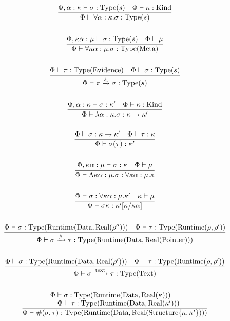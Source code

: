 \documentclass {article}
\begin{document}
\begin{gather*}
\frac
{\Phi, \alpha : \kappa \vdash \sigma : \text{Type}(s) \quad \Phi \vdash \kappa : \text{Kind}}
{\Phi \vdash \forall \alpha : \kappa. \sigma : \text{Type} (s) } \\
\\
\frac
{\Phi, \kappa \alpha : \mu \vdash \sigma : \text{Type} (s) \quad \Phi \vdash \mu  }
{\Phi \vdash \forall \kappa \alpha : \mu. \sigma : \text{Type} (\text{Meta}) } \\
\\
\frac
{\Phi \vdash \pi : \text{Type}(\text{Evidence}) \quad \Phi \vdash \sigma : \text{Type}(s)}
{\Phi \vdash \pi \xrightarrow{\xi} \sigma : \text{Type}(s)} \\
\\
\frac
{\Phi, \alpha : \kappa \vdash \sigma : \kappa' \quad \Phi \vdash \kappa : \text{Kind}} 
{\Phi \vdash \lambda \alpha : \kappa. \sigma : \kappa \to \kappa' } \\
\\
\frac
{\Phi \vdash \sigma : \kappa \to \kappa' \quad \Phi \vdash \tau : \kappa}
{\Phi \vdash \sigma (\tau) : \kappa' } \\
\\
\frac
{\Phi, \kappa \alpha : \mu \vdash \sigma : \kappa \quad \Phi \vdash \mu}
{\Phi \vdash \Lambda \kappa \alpha : \mu. \sigma : \forall \kappa \alpha : \mu. \kappa} \\
\\
\frac
{\Phi \vdash \sigma : \forall \kappa \alpha : \mu. \kappa' \quad \kappa \vdash \mu}
{\Phi \vdash \sigma \kappa : \kappa'[\kappa / \kappa \alpha]} \\
\\
\frac
{\Phi \vdash \sigma : \text{Type} (\text{Runtime} (\text{Data}, \text{Real} (\rho''))) \quad \Phi \vdash \tau : \text{Type} (\text{Runtime} (\rho, \rho'))}
{\Phi \vdash \sigma \xrightarrow{\#} \tau : \text{Type} (\text{Runtime} (\text{Data}, \text{Real} ( \text{Pointer})))} \\
\\
\frac
{\Phi \vdash \sigma : \text{Type} (\text{Runtime} (\text{Data}, \text{Real}( \rho' ))) \quad \Phi \vdash \tau : \text{Type} (\text{Runtime} (\rho, \rho'))}
{\Phi \vdash \sigma \xrightarrow{\text{text}} \tau : \text{Type} (\text{Text})} \\
\\
\frac
{\splitfrac{\Phi \vdash \sigma : \text{Type}(\text{Runtime}(\text{Data}, \text{Real}(\kappa)))}
{\Phi \vdash \tau : \text{Type} (\text{Runtime}(\text{Data}, \text{Real} (\kappa'))) }}
{\Phi \vdash \#(\sigma, \tau) : \text{Type} (\text{Runtime} (\text{Data}, \text{Real} (\text{Structure} \{ \kappa,\kappa'\} )))} \\

\end{gather*}
\end{document}

